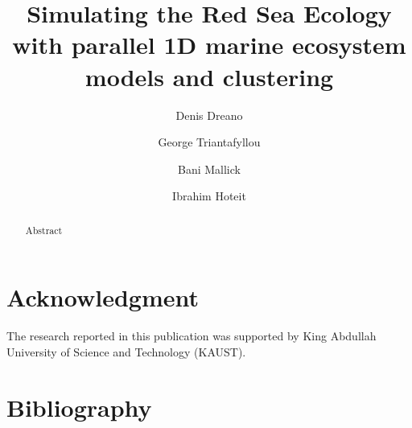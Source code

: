 \documentclass[review, authoryear]{elsarticle}
\begin{document}
\begin{frontmatter}

  \title{Simulating the Red Sea Ecology with parallel 1D marine ecosystem models
and clustering}

  \author[1]{Denis Dreano}

  \author[3]{George Triantafyllou}

  \author[2]{Bani Mallick}
  
  \author[1]{Ibrahim Hoteit}
   


  \address[1]{Computer, Electrical and Mathematical Sciences and Engineering Division, King Abdullah University of Science and Technology}

  \address[2]{Department of Statistics, Texas A\&M University}

  \address[3]{Hellenic Center for Marine Research}

  \begin{abstract}
  Abstract
  \end{abstract}

\end{frontmatter}

\linenumbers











\section*{Acknowledgment}

The research reported in this publication was supported by King Abdullah
University of Science and Technology (KAUST).

\section{Bibliography}

 
\end{document}
